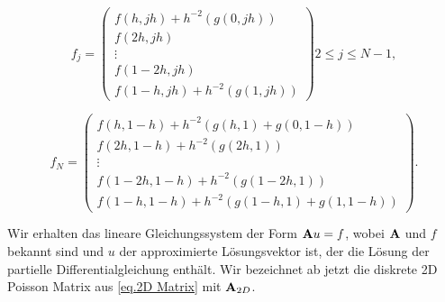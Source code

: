 \begin{equation}
f_{j} = 
\begin{pmatrix}
f(h,jh) + h^{-2}(g(0,jh)) \\
f(2h,jh) \\
\vdots \\
f(1-2h,jh) \\
f(1-h,jh) + h^{-2}(g(1,jh))
\end{pmatrix}
2 \le j \le N-1,
\end{equation}

\begin{equation}
f_{N} = 
\begin{pmatrix}
f(h,1-h) + h^{-2}(g(h,1)+g(0,1-h)) \\
f(2h,1-h) + h^{-2}(g(2h,1)) \\
\vdots \\
f(1-2h,1-h) + h^{-2}(g(1-2h,1)) \\
f(1-h,1-h) + h^{-2}(g(1-h,1)+g(1,1-h))
\end{pmatrix}.
\end{equation}

Wir erhalten das lineare Gleichungssystem der Form ${\textbf{A}}u = f$, wobei ${\textbf{A}}$ und $f$ bekannt sind und $u$ der approximierte Lösungsvektor ist, der die Lösung der partielle Differentialgleichung enthält. Wir bezeichnet ab jetzt die diskrete 2D Poisson Matrix aus \autoref{eq.2D Matrix} mit ${\textbf{A}}_{2D}$.





